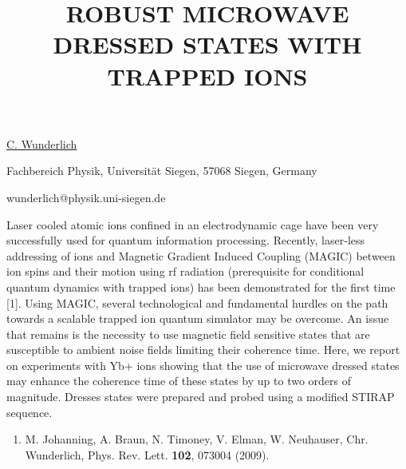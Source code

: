 \title{ROBUST MICROWAVE DRESSED STATES WITH TRAPPED IONS}

\underline{C. Wunderlich} 

{\normalsize{\vspace{-4mm}
Fachbereich Physik, Universit\"{a}t Siegen, 57068 Siegen, Germany

\email wunderlich@physik.uni-siegen.de}}

Laser cooled atomic ions confined in an electrodynamic cage have
been very successfully used for quantum information processing.
Recently, laser-less addressing of ions and Magnetic Gradient
Induced Coupling (MAGIC) between ion spins and their motion using
rf radiation (prerequisite for conditional quantum
dynamics with trapped ions) has been demonstrated for the first time
[1]. Using MAGIC, several technological and fundamental hurdles on
the path towards a scalable trapped ion quantum simulator may be
overcome. An issue that remains is the necessity to use magnetic
field sensitive states that are susceptible to ambient noise fields
limiting their coherence time. Here, we report on experiments with
Yb+ ions showing that the use of microwave dressed states may
enhance the coherence time of these states by up to two orders of
magnitude. Dresses states were prepared and probed using a modified
STIRAP sequence.

\begin{enumerate}
\item M. Johanning, A. Braun, N. Timoney, V. Elman, W. Neuhauser, Chr. Wunderlich, Phys. Rev. Lett. \textbf{102}, 073004 (2009).
\end{enumerate}


\vspace{\baselineskip} 